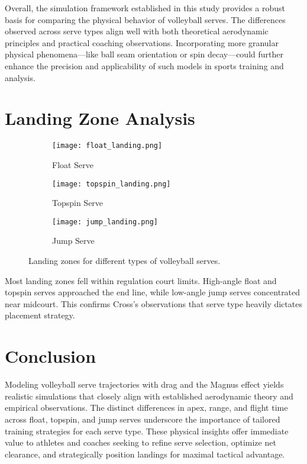 \documentclass[11pt]{article}
\begin{document}
Overall, the simulation framework established in this study provides a robust basis for comparing the physical behavior of volleyball serves. The differences observed across serve types align well with both theoretical aerodynamic principles and practical coaching observations. Incorporating more granular physical phenomena—like ball seam orientation or spin decay—could further enhance the precision and applicability of such models in sports training and analysis.

\section{Landing Zone Analysis}

\begin{figure}[H]
\centering
\begin{subfigure}[b]{0.50\textwidth}
    \centering
    \texttt{[image: float\_landing.png]}
    \caption{Float Serve}
    \label{fig:float_land}
\end{subfigure}

\vspace{0.5cm}

\begin{subfigure}[b]{0.50\textwidth}
    \centering
    \texttt{[image: topspin\_landing.png]}
    \caption{Topspin Serve}
    \label{fig:topspin_land}
\end{subfigure}

\vspace{0.5cm}

\begin{subfigure}[b]{0.50\textwidth}
    \centering
    \texttt{[image: jump\_landing.png]}
    \caption{Jump Serve}
    \label{fig:jump_land}
\end{subfigure}
\caption{Landing zones for different types of volleyball serves.}
\end{figure}


Most landing zones fell within regulation court limits. High-angle float and topspin serves approached the end line, while low-angle jump serves concentrated near midcourt. This confirms Cross’s observations\cite{cross2011float} that serve type heavily dictates placement strategy.

\section{Conclusion}

Modeling volleyball serve trajectories with drag and the Magnus effect yields realistic simulations that closely align with established aerodynamic theory and empirical observations. The distinct differences in apex, range, and flight time across float, topspin, and jump serves underscore the importance of tailored training strategies for each serve type. These physical insights offer immediate value to athletes and coaches seeking to refine serve selection, optimize net clearance, and strategically position landings for maximal tactical advantage.
\end{document}
